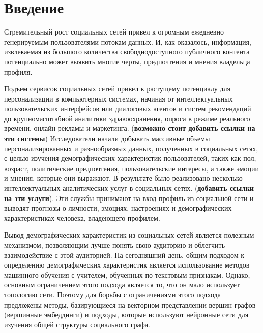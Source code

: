 \section{Введение}
Стремительный рост социальных сетей привел к огромным ежедневно генерируемым пользователями потокам данных. И, как оказалось, информация, извлекаемая из большого количества свободнодоступного публичного контента потенциально может выявить многие черты, предпочтения и мнения владельца профиля.

Подъем сервисов социальных сетей привел к растущему потенциалу
для персонализации в компьютерных системах, начиная от
интеллектуальных пользовательских интерфейсов или диалоговых агентов и
систем рекомендаций до крупномасштабной аналитики здравоохранения,
опроса в режиме реального времени, онлайн-рекламы и маркетинга. (\textbf{возможно стоит добавить ссылки на эти системы})
Исследователи начали добывать массивные объемы персонализированных и
разнообразных данных, полученных в социальных сетях, с целью изучения
демографических характеристик пользователей, таких как пол, возраст,
политические предпочтения, пользовательские
интересы, а также эмоции и мнения, которые они выражают. В результате
было реализовано несколько интеллектуальных аналитических услуг в
социальных сетях. (\textbf{добавить ссылки на эти услуги}). Эти службы принимают на вход профиль из социальной
сети и выводят прогнозы о личности, эмоциях, настроениях и
демографических характеристиках человека, владеющего профилем.

Вывод демографических характеристик из социальных сетей является полезным механизмом, позволяющим лучше понять свою аудиторию и облегчить взаимодействие с этой аудиторией.  На сегодняшний день, общим подходом к определению демографических характеристик является использование методов машинного обучения с учителем, обученных по текстовым признакам. Однако, основным ограничением этого подхода является то, что он мало использует топологию сети. Поэтому для борьбы с ограничениями этого подхода предложены методы, базирующиеся на векторном представлении вершин графов (вершинные эмбеддинги) и подходы, которые используют нейронные сети для изучения общей структуры социального графа.

\clearpage